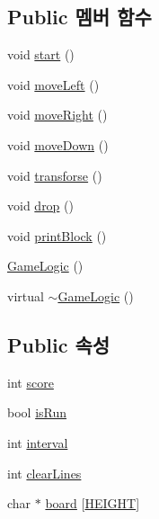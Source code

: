 \subsection*{Public 멤버 함수}
\begin{DoxyCompactItemize}
\item 
void \hyperlink{class_game_logic_aeb7d3db8014da87a18ac744d9f77131d}{start} ()
\item 
void \hyperlink{class_game_logic_a0e6c1ee03971cf619212f8bb4d5fbc83}{move\+Left} ()
\item 
void \hyperlink{class_game_logic_a6213333800f3aa800ea448ad3ee3ea7c}{move\+Right} ()
\item 
void \hyperlink{class_game_logic_a36b04a5ca335351249db8cc77019c216}{move\+Down} ()
\item 
void \hyperlink{class_game_logic_abd2dece64def6dc89e0b116fdca83483}{transforse} ()
\item 
void \hyperlink{class_game_logic_a90faee03fd4311eab796ae7dc582078d}{drop} ()
\item 
void \hyperlink{class_game_logic_ad0f9f0e6c978a3b3fa1ff7a2a3d92563}{print\+Block} ()
\item 
\hyperlink{class_game_logic_a996cd781691c36922e7ce792fcb21640}{Game\+Logic} ()
\item 
virtual \hyperlink{class_game_logic_a63a7acf778535b5f74d469de2cd39b16}{$\sim$\+Game\+Logic} ()
\end{DoxyCompactItemize}
\subsection*{Public 속성}
\begin{DoxyCompactItemize}
\item 
int \hyperlink{class_game_logic_a64ebe1cc14b91b935608ae4455fe3745}{score}
\item 
bool \hyperlink{class_game_logic_a6a95fb9e16b411f1149dcdb463cdc3a5}{is\+Run}
\item 
int \hyperlink{class_game_logic_ab9459c489b9c7bba90895756f373afc6}{interval}
\item 
int \hyperlink{class_game_logic_ab630a474170a2878d0c5ba8556e3fb39}{clear\+Lines}
\item 
char $\ast$ \hyperlink{class_game_logic_a71071a20595279a580d18dfa60ed4a1c}{board} \mbox{[}\hyperlink{_game_logic_8h_af728b7647e0b8c49832983a31f9a2e9b}{H\+E\+I\+G\+HT}\mbox{]}
\end{DoxyCompactItemize}
